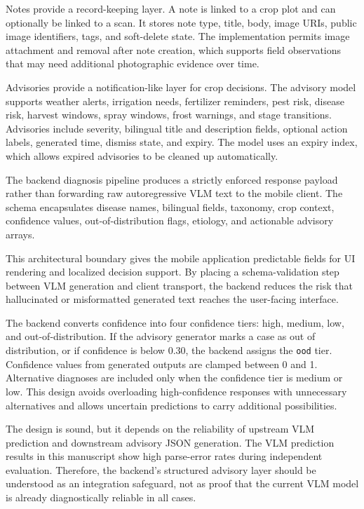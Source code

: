 Notes provide a record-keeping layer. A note is linked to a crop plot and can optionally be linked
to a scan. It stores note type, title, body, image URIs, public image identifiers, tags, and
soft-delete state. The implementation permits image attachment and removal after note creation,
which supports field observations that may need additional photographic evidence over time.

Advisories provide a notification-like layer for crop decisions. The advisory model supports
weather alerts, irrigation needs, fertilizer reminders, pest risk, disease risk, harvest windows,
spray windows, frost warnings, and stage transitions. Advisories include severity, bilingual title
and description fields, optional action labels, generated time, dismiss state, and expiry. The
model uses an expiry index, which allows expired advisories to be cleaned up automatically.



The backend diagnosis pipeline produces a strictly enforced response payload rather than
forwarding raw autoregressive VLM text to the mobile client. The schema encapsulates disease
names, bilingual fields, taxonomy, crop context, confidence values, out-of-distribution flags,
etiology, and actionable advisory arrays.

This architectural boundary gives the mobile application predictable fields for UI rendering and
localized decision support. By placing a schema-validation step between VLM generation and client
transport, the backend reduces the risk that hallucinated or misformatted generated text reaches
the user-facing interface.


The backend converts confidence into four confidence tiers: high, medium, low, and
out-of-distribution. If the advisory generator marks a case as out of distribution, or if confidence is
below 0.30, the backend assigns the \texttt{ood} tier. Confidence values from generated outputs are
clamped between 0 and 1. Alternative diagnoses are included only when the confidence tier is medium
or low. This design avoids overloading high-confidence responses with unnecessary alternatives and
allows uncertain predictions to carry additional possibilities.

The design is sound, but it depends on the reliability of upstream VLM prediction and downstream
advisory JSON generation. The VLM prediction results in this manuscript show high parse-error
rates during independent evaluation. Therefore, the backend's structured advisory layer should be
understood as an integration safeguard, not as proof that the current VLM model is already
diagnostically reliable in all cases.

